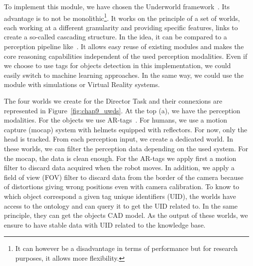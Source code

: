 To implement this module, we have chosen the Underworld framework~\cite{lemaignan_2018_underworlds}. Its advantage is to not be monolithic\footnote{It can however be a disadvantage in terms of performance but for research purposes, it allows more flexibility.}. It works on the principle of a set of worlds, each working at a different granularity and providing specific features, links to create a so-called cascading structure. In the idea, it can be compared to a perception pipeline like~\cite{beetz_2015_robosherlock}. It allows easy reuse of existing modules and makes the core reasoning capabilities independent of the used perception modalities. Even if we choose to use tags for objects detection in this implementation, we could easily switch to machine learning approaches. In the same way, we could use the module with simulations or Virtual Reality systems.

The four worlds we create for the Director Task and their connexions are represented in Figure~\ref{fig:chap9_uwds}. At the top (a), we have the perception modalities. For the objects we use AR-tags~\cite{fiala_2005_artag}. For humans, we use a motion capture (mocap) system with helmets equipped with reflectors. For now, only the head is tracked. From each perception input, we create a dedicated world. In these worlds, we can filter the perception data depending on the used system. For the mocap, the data is clean enough. For the AR-tags we apply first a motion filter to discard data acquired when the robot moves. In addition, we apply a field of view (FOV) filter to discard data from the border of the camera because of distortions giving wrong positions even with camera calibration. To know to which object correspond a given tag unique identifiers (UID), the worlds have access to the ontology and can query it to get the UID related to. In the same principle, they can get the objects CAD model. As the output of these worlds, we ensure to have stable data with UID related to the knowledge base.

